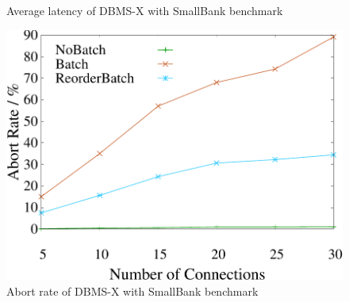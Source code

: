 \begin{figure}[t]
\begin{minipage}[b]{0.31\linewidth}
	\vspace{-2em}
	\caption{Average latency of DBMS-X with SmallBank benchmark}
	\label{fig:hekaton:latency}
	\end{minipage}
	\begin{minipage}[b]{0.31\linewidth}
	\centering
	\includegraphics[width=\textwidth]{./exp_fig/hekaton/hekaton_abort}
	\vspace{-2em}
	\caption{Abort rate of DBMS-X with SmallBank benchmark}
	\label{fig:hekaton:abort}
	\end{minipage}
\end{figure}



